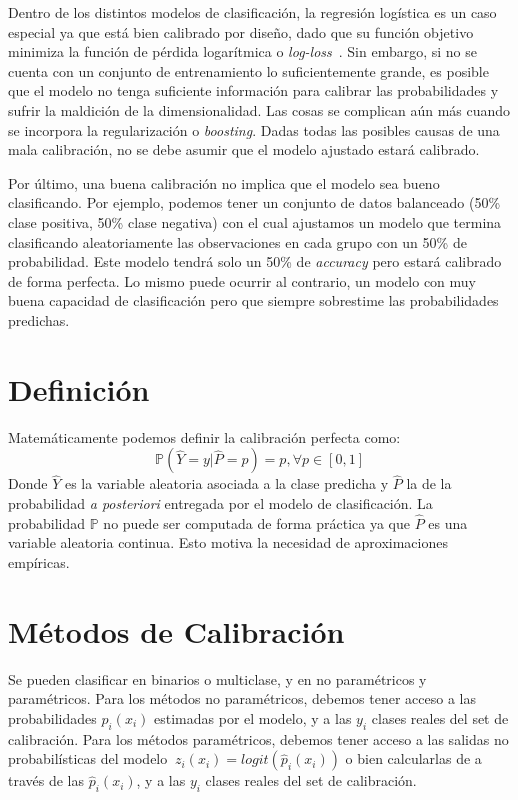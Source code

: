 Dentro de los distintos modelos de clasificación, la regresión logística es un
caso especial ya que está bien calibrado por diseño, dado que su función
objetivo minimiza la función de pérdida logarítmica o {\it
log-loss\/}~\cite{morrison2013tutorial}. Sin  embargo, si no se cuenta con un
conjunto de entrenamiento lo suficientemente grande, es posible que el modelo no
tenga suficiente información para calibrar las probabilidades y sufrir la
maldición de la dimensionalidad. Las cosas se complican aún más cuando se
incorpora la regularización o {\it boosting\/}. Dadas todas las posibles causas
de una mala calibración, no se debe asumir que el modelo ajustado estará
calibrado.

Por último, una buena calibración no implica que el modelo sea bueno
clasificando. Por ejemplo, podemos tener un conjunto de datos balanceado (50\%
clase positiva, 50\% clase negativa) con el cual ajustamos un modelo que termina
clasificando aleatoriamente las observaciones en cada grupo con un 50\% de
probabilidad. Este modelo tendrá solo un 50\% de {\it accuracy\/} pero estará
calibrado de forma perfecta. Lo mismo puede ocurrir al contrario, un modelo con
muy buena capacidad de clasificación pero que siempre sobrestime las
probabilidades predichas.

\section{Definición}

Matemáticamente podemos definir la calibración perfecta como:
\begin{equation}
    \mathbb{P}(\hat{Y}=y|\hat{P}=p) = p, \forall p \in [0,1]\label{ecuacion:perfect_calibration}
\end{equation}
Donde \(\hat{Y}\) es la variable aleatoria asociada a la clase predicha y
\(\hat{P}\) la de la probabilidad {\it a posteriori\/} entregada por el modelo
de clasificación. La probabilidad \(\mathbb{P}\) no puede ser computada de forma
práctica ya que \(\hat{P}\) es una variable aleatoria continua. Esto motiva la
necesidad de aproximaciones empíricas.

\section{Métodos de Calibración}

Se pueden clasificar en binarios o multiclase, y en no paramétricos y
paramétricos. Para los métodos no paramétricos, debemos tener acceso a las
probabilidades $\hat p_{i}(x_i)$ estimadas por el modelo, y a las $y_{i}$ clases
reales del set de calibración. Para los métodos paramétricos, debemos tener
acceso a las salidas no probabilísticas del modelo $\ z_{i}(x_i) = logit(\hat
p_{i}(x_i))$ o bien calcularlas de a través de las $\hat p_{i}(x_i)$, y a las
$y_{i}$ clases reales del set de calibración.

